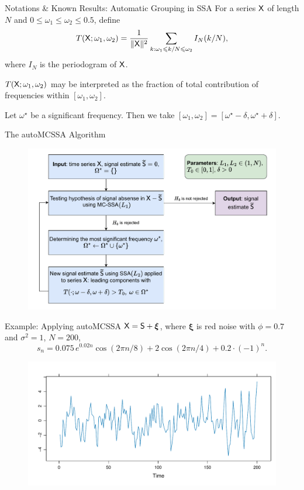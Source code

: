 \documentclass[notheorems, handout]{beamer}
\begin{document}
\begin{frame}{Notations \& Known Results: Automatic Grouping in SSA}
	For a series $\mathsf{X}$ of length $N$ and $0\leqslant\omega_1\leqslant\omega_2\leqslant0.5$, define
	$$
		T(\mathsf{X}; \omega_1,\omega_2)=\frac{1}{\|\mathsf{X}\|^2}\sum_{k:\omega_1\leqslant k / N \leqslant \omega_2}I_N(k / N),
	$$
	where $I_N$ is the periodogram of $\mathsf{X}$. \medskip

	$T(\mathsf{X}; \omega_1, \omega_2)$ may be interpreted as the fraction of total contribution of frequencies within $[\omega_1, \omega_2]$.\bigskip

	Let $\omega^\star$ be a significant frequency. Then we take $[\omega_1, \omega_2]=[\omega^\star-\delta, \omega^\star + \delta]$.
\end{frame}

\begin{frame}{The autoMCSSA Algorithm}
	\begin{figure}
		\centering
		\includegraphics[width=\textwidth]{../paper/img/auto_mcssa_alg.pdf}
	\end{figure}
\end{frame}

\begin{frame}{Example: Applying autoMCSSA}
	$\mathsf{X}=\mathsf{S}+\boldsymbol{\xi}$, where $\boldsymbol{\xi}$ is red noise with $\phi=0.7$ and $\sigma^2=1$, $N=200$,
	$$
		s_n=0.075\,e^{0.02n}\cos(2\pi n / 8) + 2\cos(2\pi n / 4) + 0.2\cdot (-1)^n.
	$$\vspace{-2.5em}
	\begin{figure}
		\centering
		\includegraphics[width=\textwidth]{img/noise_ts.pdf}
	\end{figure}
\end{frame}
\end{document}
